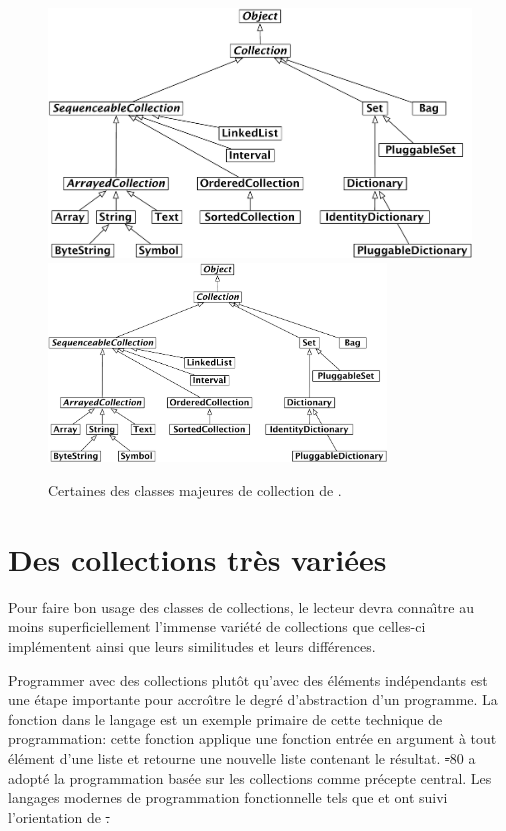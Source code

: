 \documentclass[a4paper,10pt,twoside]{book}
\begin{document}
\begin{figure}
\begin{center}
\ifluluelse
	{\includegraphics[width=\textwidth]{CollectionHierarchy}}
	{\includegraphics[width=0.8\textwidth]{CollectionHierarchy}}
\caption{Certaines des classes majeures de collection de \pharo.}
\end{center}
\end{figure}

\section{Des collections très variées}

Pour faire bon usage des classes de collections, le lecteur devra conna\^{\i}tre
au moins superficiellement l'immense vari\'et\'e de collections que celles-ci
impl\'ementent ainsi que leurs similitudes et leurs diff\'erences.

Programmer avec des collections plut\^ot qu'avec des \'el\'ements 
ind\'ependants est une \'etape importante pour accro\^{\i}tre le degr\'e
d'abstraction d'un programme.
La fonction  dans le langage  est un exemple
primaire de cette technique de programmation: cette fonction
applique une fonction entr\'ee en argument \`a tout \'el\'ement d'une
liste et retourne une nouvelle liste contenant le r\'esultat.
\st-80 a adopt\'e la programmation bas\'ee sur les collections
comme pr\'ecepte central.
Les langages modernes de programmation fonctionnelle tels que 
et  ont suivi l'orientation de \st. 
\end{document}
